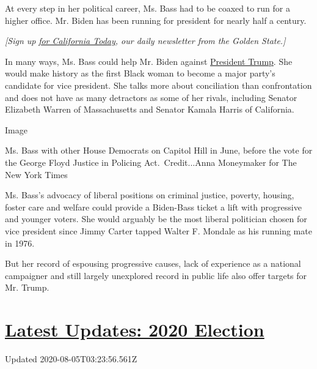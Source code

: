 At every step in her political career, Ms. Bass had to be coaxed to run
for a higher office. Mr. Biden has been running for president for nearly
half a century.

\emph{{[}Sign up}
\href{https://www.nytimes3xbfgragh.onion/newsletters/california-today}{\emph{for
California Today}}\emph{, our daily newsletter from the Golden
State.{]}}

In many ways, Ms. Bass could help Mr. Biden against
\href{https://www.nytimes3xbfgragh.onion/interactive/2020/us/elections/donald-trump.html}{President
Trump}. She would make history as the first Black woman to become a
major party's candidate for vice president. She talks more about
conciliation than confrontation and does not have as many detractors as
some of her rivals, including Senator Elizabeth Warren of Massachusetts
and Senator Kamala Harris of California.

Image

Ms. Bass with other House Democrats on Capitol Hill in June, before the
vote for the George Floyd Justice in Policing Act.~Credit...Anna
Moneymaker for The New York Times

Ms. Bass's advocacy of liberal positions on criminal justice, poverty,
housing, foster care and welfare could provide a Biden-Bass ticket a
lift with progressive and younger voters. She would arguably be the most
liberal politician chosen for vice president since Jimmy Carter tapped
Walter F. Mondale as his running mate in 1976.

But her record of espousing progressive causes, lack of experience as a
national campaigner and still largely unexplored record in public life
also offer targets for Mr. Trump.

\hypertarget{latest-updates-2020-election}{%
\section{\texorpdfstring{\href{https://www.nytimes3xbfgragh.onion/2020/08/04/us/elections/primary-election-michigan-arizona-kansas.html?action=click\&pgtype=Article\&state=default\&region=MAIN_CONTENT_1\&context=storylines_live_updates}{Latest
Updates: 2020
Election}}{Latest Updates: 2020 Election}}\label{latest-updates-2020-election}}

Updated 2020-08-05T03:23:56.561Z


